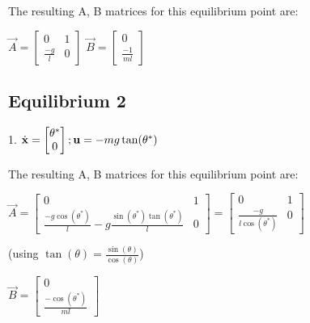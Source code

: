\documentclass[10pt]{article}
\begin{document}
The resulting A, B matrices for this equilibrium point are:
\begin{center}
    \begin{math}
        \vec{A} = 
        \begin{bmatrix}
        0 &1 \\ \frac{-g}{l} & 0
        \end{bmatrix}
    \end{math}
    \begin{math}
        \vec{B} = 
        \begin{bmatrix}
        0\\ \frac{-1}{ml}
        \end{bmatrix}
    \end{math}
\end{center}


\subsection{Equilibrium 2}
\begin{center}
    1.
    \begin{math}
     {\dot{\mathbf{x}}} =
     \begin{bmatrix} \theta^* \\ 0 \end{bmatrix}
     ;
     \mathbf{u} = -mg\tan(\theta^*)
    \end{math}
\end{center}

The resulting A, B matrices for this equilibrium point are:
\begin{center}
    \begin{math}
        \vec{A} = 
        \begin{bmatrix}
        0 &1 \\ \frac{-g\cos(\theta^*)}{l} - g \frac{\sin(\theta^*) \tan(\theta^*)}{l} & 0
        \end{bmatrix}
        =
        \begin{bmatrix}
        0 &1 \\ \frac{-g}{l\cos(\theta^*)} & 0
        \end{bmatrix}
        \end{math}
        
        (using $\tan(\theta) = \frac{\sin(\theta)}{\cos(\theta)}$)
        
        \begin{math}
        \vec{B} = 
        \begin{bmatrix}
        0\\ \frac{-\cos(\theta^*)}{ml}
        \end{bmatrix}
    \end{math}
\end{center}
\end{document}
